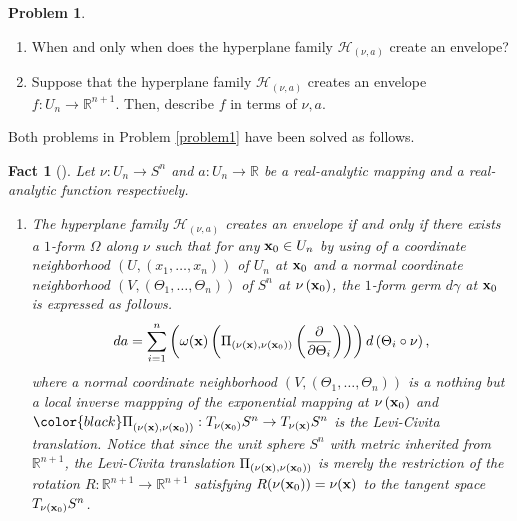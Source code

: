 \documentclass{amsart}
\newtheorem{fact}{Fact}
\theoremstyle{definition}
\theoremstyle{definition}
\theoremstyle{definition}
\newtheorem{problem}{Problem}
\newcommand{\ch}[1]{{\color{black} #1}}
\begin{document}
{\begin{problem}
\begin{enumerate}
\item[(1)] When and only when does the hyperplane family 
$\mathcal{H}_{(\nu, a)}$ create an envelope? \\ 
\item[(2)] Suppose that the hyperplane family $\mathcal{H}_{(\nu, a)}$ creates 
an envelope $f: U_n\to \mathbb{R}^{n+1}$.     
Then, describe $f$ in terms of $\nu, a$.    
\end{enumerate}
\end{problem}
Both problems in Problem \ref{problem1} \ch{have} been solved as follows.   
\begin{fact}[\cite{nishimura}]\label{fact0}
Let $\nu: U_n\to S^n$ and $a: U_n\to \mathbb{R}$ 
be a real-analytic mapping and a real- analytic function respectively. 
\begin{enumerate}
\item[(1)] The hyperplane family 
$\mathcal{H}_{\left(\nu, a\right)}$ 
creates an envelope if and only if 
there exists a $1$-form {$\Omega$} along 
${\nu}$ such that for any ${\bf x}_0\in U_n$ 
by using of a coordinate neighborhood 
$\left(U, \left(x_1, \ldots, x_n\right)\right)$ of $U_n$ at 
${\bf x}_0$ and 
a \textit{normal} coordinate neighborhood 
$\left(V, \left(\Theta_1, \ldots, 
\Theta_n\right)\right)$ 
of  $S^n$ at  
${\nu}\left({\bf x}_0\right)$, %
the $1$-form germ 
$d{\gamma}$ at ${\bf x}_0$ 
is expressed %
as follows.   
\[
d{a} = 
\sum_{i=1}^n \left(\omega({\bf x})
\left({\Pi}_{\left({\nu}({\bf x}), {\nu}({\bf x}_0)\right)} 
\left(\frac{\partial}{\partial \Theta_i}\right) \right) \right)
d \left(\Theta_i\circ{\nu}\right), 
\]
where {
a normal coordinate neighborhood   
$\left(V, \left(\Theta_1, \ldots, 
\Theta_n\right)\right)$ is a 
nothing but a local inverse mappping of 
the exponential mapping at 
${\nu}\left({\bf x}_0\right)$ and   
${\color{black}\Pi}_{\left({\nu}({\bf x}), {\nu}({\bf x}_0)\right)} : 
T_{{\nu}\left({\bf x}_0\right)}S^n\to T_ {{\nu}\left({\bf x}\right)}S^n$ 
is the Levi-Civita translation.      
{Notice that since the unit sphere $S^n$ with metric inherited from 
$\mathbb{R}^{n+1}$, the Levi-Civita translation 
$\Pi_{\left({\nu}({\bf x}), {\nu}({\bf x}_0)\right)}$ 
is merely the restriction of the rotation 
$R: \mathbb{R}^{n+1}\to \mathbb{R}^{n+1}$ 
satisfying $R({\nu}({\bf x}_0))={\nu}({\bf x})$ 
to the tangent space $T_{{\nu}\left({\bf x}_0\right)}S^n$.    
}}
\end{enumerate}
\end{fact}}
\end{document}
